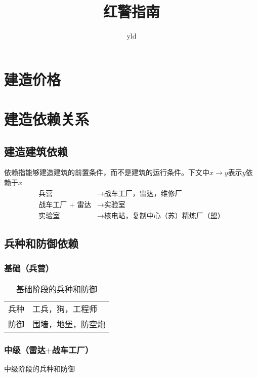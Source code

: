 \documentclass[12pt]{ctexart}
\title{红警指南}
\author{yld}
\date{}
\begin{document}
	\maketitle
	\newpage
	\tableofcontents
	\newpage
	
	\section{建造价格}
		
	\newpage
	
	\section{建造依赖关系}
		\subsection{建造建筑依赖}
			依赖指能够建造建筑的前置条件，而不是建筑的运行条件。下文中$x \rightarrow y$表示$y$依赖于$x$
			\begin{align*}
				\text{兵营} &\rightarrow \text{战车工厂，雷达，维修厂}\\
				\text{战车工厂 + 雷达} &\rightarrow \text{实验室}\\
				\text{实验室} &\rightarrow \text{核电站，复制中心（苏）精炼厂（盟）}
			\end{align*}
			
		\subsection{兵种和防御依赖}
			\subsubsection{基础（兵营）}
			\begin{table}[h]
				\begin{center}
					\begin{tabular}{l|l}
						\toprule
						\midrule
						兵种 & 工兵，狗，工程师\\
						防御 & 围墙，地堡，防空炮\\
						\bottomrule
					\end{tabular}
					\label{tab:表1}
					\caption{基础阶段的兵种和防御}
				\end{center}
			\end{table}
			
			\subsubsection{中级（雷达$+$战车工厂）}
			\begin{table}[h]
				\begin{center}
					\label{tab:表2}
					\caption{中级阶段的兵种和防御}
				\end{center}
			\end{table}
			
\end{document}
